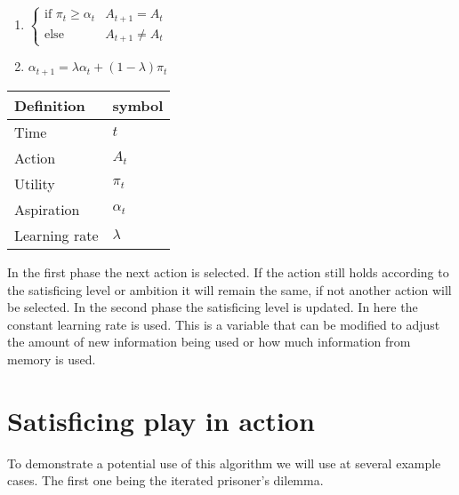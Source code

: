 \begin{enumerate}
  \item $ \begin{cases}
              \text{if } \pi_t \geq \alpha_t & A_{t+1} = A_t\\
              \text{else} & A_{t+1} \neq A_t
              \end{cases}$
  \item $ \alpha_{t+1} = \lambda \alpha_t + (1-\lambda) \pi_t $ \\
\end{enumerate}
\begin{tabular}{ll}
  Definition & symbol \\ \toprule
  Time & $t$ \\
  Action & $A_t$ \\
  Utility & $\pi_t$ \\
  Aspiration & $\alpha_t$ \\
  Learning rate & $\lambda$ \\ \bottomrule
\end{tabular}

In the first phase the next action is selected. If the action still holds
according to the satisficing level or ambition it will remain the same, if not another
action will be selected. In the second phase the satisficing level is updated.
In here the constant learning rate is used. This is a variable that can be
modified to adjust the amount of new information being used or how much
information from memory is used.


\section{Satisficing play in action}
\label{sec:playaction}
\toReview
To demonstrate a potential use of this algorithm we will use at several example
cases. The first one being the iterated prisoner's dilemma.

